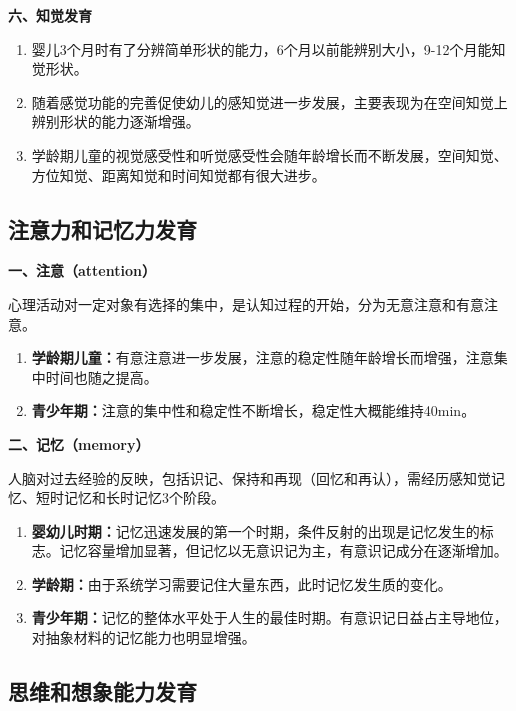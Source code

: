\begin{keybox}
\textbf{六、知觉发育}

\begin{enumerate}[leftmargin=*]
    \item 婴儿3个月时有了分辨简单形状的能力，6个月以前能辨别大小，9-12个月能知觉形状。
    \item 随着感觉功能的完善促使幼儿的感知觉进一步发展，主要表现为在空间知觉上辨别形状的能力逐渐增强。
    \item 学龄期儿童的视觉感受性和听觉感受性会随年龄增长而不断发展，空间知觉、方位知觉、距离知觉和时间知觉都有很大进步。
\end{enumerate}
\end{keybox}

\subsection{注意力和记忆力发育}

\begin{keybox}
\textbf{一、注意（attention）}

心理活动对一定对象有选择的集中，是认知过程的开始，分为无意注意和有意注意。

\begin{enumerate}[leftmargin=*]
    \item \textbf{学龄期儿童：}有意注意进一步发展，注意的稳定性随年龄增长而增强，注意集中时间也随之提高。
    \item \textbf{青少年期：}注意的集中性和稳定性不断增长，稳定性大概能维持40min。
\end{enumerate}

\textbf{二、记忆（memory）}

人脑对过去经验的反映，包括识记、保持和再现（回忆和再认），需经历感知觉记忆、短时记忆和长时记忆3个阶段。

\begin{enumerate}[leftmargin=*]
    \item \textbf{婴幼儿时期：}记忆迅速发展的第一个时期，条件反射的出现是记忆发生的标志。记忆容量增加显著，但记忆以无意识记为主，有意识记成分在逐渐增加。
    \item \textbf{学龄期：}由于系统学习需要记住大量东西，此时记忆发生质的变化。
    \item \textbf{青少年期：}记忆的整体水平处于人生的最佳时期。有意识记日益占主导地位，对抽象材料的记忆能力也明显增强。
\end{enumerate}
\end{keybox}

\subsection{思维和想象能力发育}

